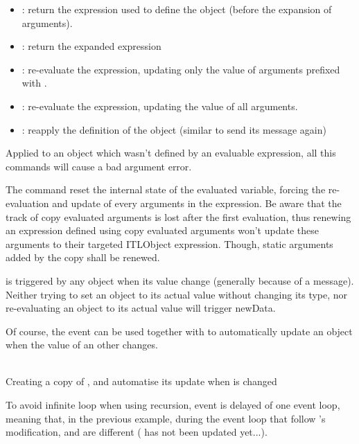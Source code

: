 \begin{itemize}
\item {}: return the expression used to define the object (before the expansion of \OSC{\lowTilde} arguments).
\item {}: return the expanded expression

\item {}: re-evaluate the expression, updating only the value of arguments prefixed with \OSC{\&}.
\item {}: re-evaluate the expression, updating the value of all arguments.
\item {}: reapply the definition of the object (similar to send its  message again)
\end{itemize}

Applied to an object which wasn't defined by an evaluable expression, all this commands will cause a bad argument error.
\smallbreak

The  command reset the internal state of the evaluated variable, forcing the re-evaluation and update of every arguments in the expression. Be aware that the track of copy evaluated arguments is lost after the first evaluation, thus renewing an expression defined using copy evaluated arguments won't update these arguments to their targeted ITLObject expression. Though, static arguments added by the copy shall be renewed.



 is triggered by any object when its value change (generally because of a  message). Neither trying to set an object to its actual value without changing its type, nor re-evaluating an object to its actual value will trigger newData.

Of course, the  event can be used together with  to automatically update an object when the value of an other changes.

\example\\
Creating a copy of , and automatise its update when  is changed

To avoid infinite loop when using recursion,  event is delayed of one event loop, meaning that, in the previous example, during the event loop that follow 's modification,  and  are different ( has not been updated yet...).

